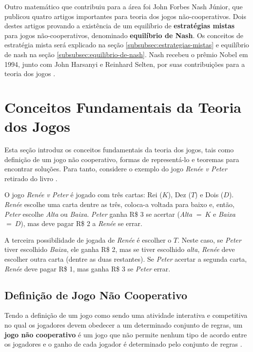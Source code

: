 Outro matemático que contribuiu para a área foi John Forbes Nash Júnior, que publicou quatro artigos importantes para teoria dos jogos não-cooperativos. Dois destes artigos provando a existência de um equilíbrio de \textbf{estratégias mistas} para jogos não-cooperativos, denominado \textbf{equilíbrio de Nash}. Os conceitos de estratégia mista será explicado na seção \ref{subsubsec:estrategias-mistas} e equilíbrio de nash na seção \ref{subsubsec:equilibrio-de-nash}. Nash recebeu o prêmio Nobel em 1994, junto com John Harsanyi e Reinhard Selten, por suas contribuições para a teoria dos jogos \cite[p.~3--4]{sartini_IIbienaldasbm}.

\section{Conceitos Fundamentais da Teoria dos Jogos}
\label{sec:conceitos-fundamentais-da-teoria-dos-jogos}

Esta seção introduz os conceitos fundamentais da teoria dos jogos, tais como definição de um jogo não cooperativo, formas de representá-lo e teoremas para encontrar soluções. Para tanto, considere o exemplo do jogo \emph{Renée v Peter} retirado do livro \cite{jones_1980}.

\begin{myex}\label{ex:renee-v-peter}
O jogo \emph{Renée v Peter} é jogado com três cartas: Rei ($K$), Dez ($T$) e Dois ($D$). \emph{Renée} escolhe uma carta dentre as três, coloca-a voltada para baixo e, então, \emph{Peter} escolhe \emph{Alta} ou \emph{Baixa}. \emph{Peter} ganha R\$ 3 se acertar (\emph{Alta} $=\ K$ e \emph{Baixa} $=\ D$), mas deve pagar R\$ 2 a \emph{Renée} se errar.

A terceira possibilidade de jogada de \emph{Renée} é escolher o $T$. Neste caso, se \emph{Peter} tiver escolhido \emph{Baixa}, ele ganha R\$ 2, mas se tiver escolhido \emph{alta}, \emph{Renée} deve escolher outra carta (dentre as duas restantes). Se \emph{Peter} acertar a segunda carta, \emph{Renée} deve pagar R\$ 1, mas ganha R\$ 3 se \emph{Peter} errar.
\end{myex}

\subsection{Definição de Jogo Não Cooperativo}
\label{subsec:definicao-de-jogo-nao-cooperativo}

Tendo a definição de um jogo como sendo uma atividade interativa e competitiva no qual os jogadores devem obedecer a um determinado conjunto de regras, um \textbf{jogo não cooperativo} é um jogo que não permite nenhum tipo de acordo entre os jogadores e o ganho de cada jogador é determinado pelo conjunto de regras \cite{jones_1980}.

